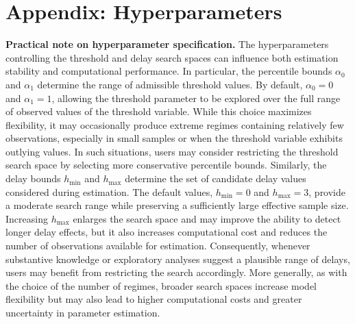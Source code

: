 \begin{itemize}
\end{itemize}

\section{Appendix: Hyperparameters}\label{priors}
\textbf{Practical note on hyperparameter specification.}
The hyperparameters controlling the threshold and delay search spaces can influence both estimation stability and computational performance. In particular, the percentile bounds $\alpha_0$ and $\alpha_1$ determine the range of admissible threshold values. By default, $\alpha_0 = 0$ and $\alpha_1 = 1$, allowing the threshold parameter to be explored over the full range of observed values of the threshold variable. While this choice maximizes flexibility, it may occasionally produce extreme regimes containing relatively few observations, especially in small samples or when the threshold variable exhibits outlying values. In such situations, users may consider restricting the threshold search space by selecting more conservative percentile bounds. Similarly, the delay bounds $h_{\min}$ and $h_{\max}$ determine the set of candidate delay values considered during estimation. The default values, $h_{\min}=0$ and $h_{\max}=3$, provide a moderate search range while preserving a sufficiently large effective sample size. Increasing $h_{\max}$ enlarges the search space and may improve the ability to detect longer delay effects, but it also increases computational cost and reduces the number of observations available for estimation. Consequently, whenever substantive knowledge or exploratory analyses suggest a plausible range of delays, users may benefit from restricting the search accordingly. More generally, as with the choice of the number of regimes, broader search spaces increase model flexibility but may also lead to higher computational costs and greater uncertainty in parameter estimation.

\clearpage


\address{Luis Hernando Vanegas\\
  Departamento de Estadística, Universidad Nacional de Colombia\\
  Ciudad Universitaria, Bogotá\\
  Colombia\\
  }

\address{Sergio Alejandro Calderón\\
  Departamento de Estadística, Universidad Nacional de Colombia\\
  Ciudad Universitaria, Bogotá\\
  Colombia\\
  }

\address{Luz Marina Rondón\\
  Departamento de Estadística, Universidad Nacional de Colombia\\
  Ciudad Universitaria, Bogotá\\
  Colombia\\
  }

